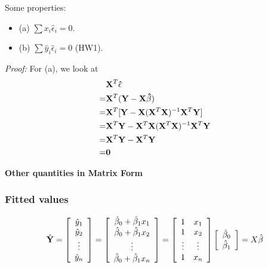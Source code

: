 \medskip

Some properties:
\begin{itemize}
  \item (a) $\sum{x_i \hat{\epsilon}_i} = 0$.
  \item (b) $\sum{\hat{y}_i \hat{\epsilon}_i} = 0$ (HW1).
\end{itemize}

{\it Proof:} 
For (a), we look at
$$
\begin{aligned}
&\mathbf{X}^T \mathbf{\hat{\epsilon}} \\
=& \mathbf{X}^T (\mathbf{Y - X\hat{\beta}}) \\
=& \mathbf{X}^T [\mathbf{Y} - \mathbf{X} (\mathbf{X}^T\mathbf{X})^{-1}\mathbf{X}^T \mathbf{Y}] \\
=& \mathbf{X}^T \mathbf{Y} - \mathbf{X}^T \mathbf{X} (\mathbf{X}^T\mathbf{X})^{-1}\mathbf{X}^T \mathbf{Y} \\
=& \mathbf{X}^T \mathbf{Y} - \mathbf{X}^T \mathbf{Y}\\
=& \mathbf{0}
\end{aligned}
$$


{\bf Other quantities in Matrix Form }
\subsubsection*{Fitted values}
$$
\hat{\mathbf{Y}} = \left[ \begin{array}{c} \hat{y}_1\\ \hat{y}_2 \\ \vdots \\ \hat{y}_n\\ \end{array} \right] =  \left[ \begin{array}{c} \hat{\beta}_0 + \hat{\beta}_1 x_1\\  \hat{\beta}_0 + \hat{\beta}_1 x_2 \\ \vdots \\  \hat{\beta}_0 + \hat{\beta}_1 x_n\\ \end{array} \right]
=  \left[ \begin{array}{cc} 1   &x_1\\ 1 & x_2 \\ \vdots & \vdots \\ 1 & x_n\\ \end{array} \right] \left[ \begin{array}{c} \hat{\beta}_0\\ \hat{\beta}_1 \\ \end{array} \right]  = X\hat{\beta}
$$

